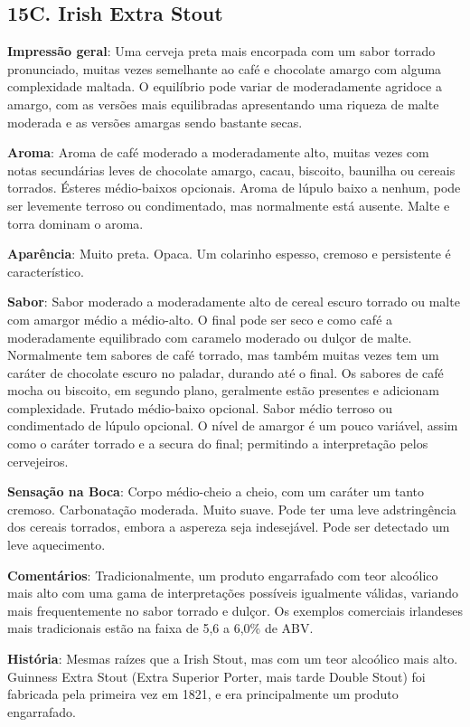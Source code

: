 \subsection*{15C. Irish Extra Stout}
\textbf{Impressão geral}: Uma cerveja preta mais encorpada com um sabor torrado pronunciado, muitas vezes semelhante ao café e chocolate amargo com alguma complexidade maltada. O equilíbrio pode variar de moderadamente agridoce a amargo, com as versões mais equilibradas apresentando uma riqueza de malte moderada e as versões amargas sendo bastante secas.

\textbf{Aroma}: Aroma de café moderado a moderadamente alto, muitas vezes com notas secundárias leves de chocolate amargo, cacau, biscoito, baunilha ou cereais torrados. Ésteres médio-baixos opcionais. Aroma de lúpulo baixo a nenhum, pode ser levemente terroso ou condimentado, mas normalmente está ausente. Malte e torra dominam o aroma.

\textbf{Aparência}: Muito preta. Opaca. Um colarinho espesso, cremoso e persistente é característico.

\textbf{Sabor}: Sabor moderado a moderadamente alto de cereal escuro torrado ou malte com amargor médio a médio-alto. O final pode ser seco e como café a moderadamente equilibrado com caramelo moderado ou dulçor de malte. Normalmente tem sabores de café torrado, mas também muitas vezes tem um caráter de chocolate escuro no paladar, durando até o final. Os sabores de café mocha ou biscoito, em segundo plano, geralmente estão presentes e adicionam complexidade. Frutado médio-baixo opcional. Sabor médio terroso ou condimentado de lúpulo opcional. O nível de amargor é um pouco variável, assim como o caráter torrado e a secura do final; permitindo a interpretação pelos cervejeiros.

\textbf{Sensação na Boca}: Corpo médio-cheio a cheio, com um caráter um tanto cremoso. Carbonatação moderada. Muito suave. Pode ter uma leve adstringência dos cereais torrados, embora a aspereza seja indesejável. Pode ser detectado um leve aquecimento.

\textbf{Comentários}: Tradicionalmente, um produto engarrafado
com teor alcoólico mais alto com uma gama de interpretações
possíveis igualmente válidas, variando mais frequentemente
no sabor torrado e dulçor. Os exemplos comerciais irlandeses
mais tradicionais estão na faixa de 5,6 a 6,0\% de ABV.

\textbf{História}: Mesmas raízes que a Irish Stout, mas com um teor alcoólico mais alto. Guinness Extra Stout (Extra Superior Porter, mais tarde Double Stout) foi fabricada pela primeira vez em 1821, e era principalmente um produto engarrafado.

